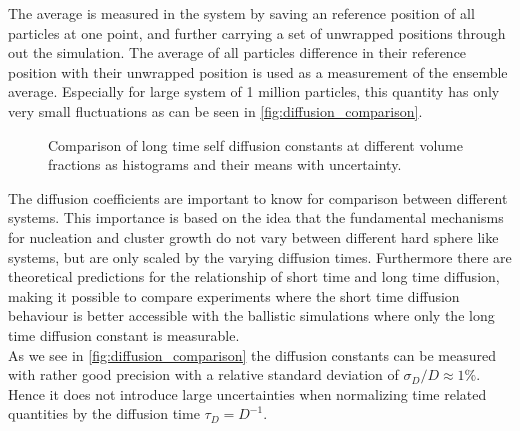 The average is measured in the system by saving an reference position of all particles at one point, and further carrying a set of unwrapped positions through out the simulation. The average of all particles difference in their reference position with their unwrapped position is used as a measurement of the ensemble average. Especially for large system of 1 million particles, this quantity has only very small fluctuations as can be seen in \autoref{fig:diffusion_comparison}.


\begin{figure}[ht]
\begin{center}
 \hspace{0.5cm}
\caption[Result of long time self-diffusion constants from production data]{Comparison of long time self diffusion constants at different volume fractions as histograms and their means with uncertainty.}
\label{fig:diffusion_comparison}
\end{center}
\end{figure}

The diffusion coefficients are important to know for comparison between different systems. This importance is based on the idea that the fundamental mechanisms for nucleation and cluster growth do not vary between different hard sphere like systems, but are only scaled by the varying diffusion times. Furthermore there are theoretical predictions for the relationship of short time and long time diffusion, making it possible to compare experiments where the short time diffusion behaviour is better accessible with the ballistic simulations where only the long time diffusion constant is measurable.\\


As we see in \autoref{fig:diffusion_comparison} the diffusion constants can be measured with rather good precision with a relative standard deviation of $\sigma_D/D \approx 1\%$. Hence it does not introduce large uncertainties when normalizing time related quantities by the diffusion time $\tau_{D} = D^{-1}$.

